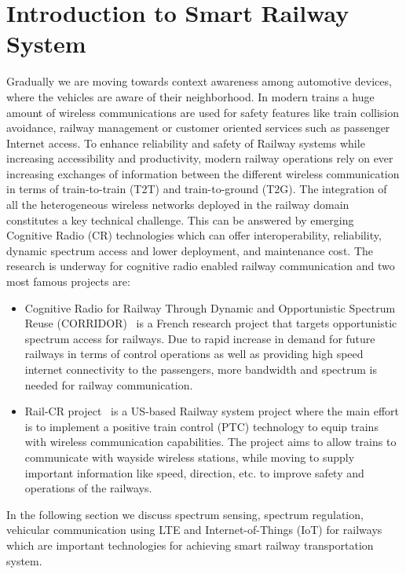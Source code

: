 \chapter{Introduction to Smart Railway System}

Gradually we are moving towards context awareness among automotive devices, where the vehicles are aware of their neighborhood. In modern trains a huge amount of wireless communications are used for safety features like train collision avoidance, railway management or customer oriented services such as passenger Internet access. To enhance reliability and safety of Railway systems while increasing accessibility and productivity, modern railway operations rely on ever increasing exchanges of information between the different wireless communication in terms of train-to-train (T2T) and train-to-ground (T2G). The integration of all the heterogeneous wireless networks deployed in the railway domain constitutes a key technical challenge. This can be answered by emerging Cognitive Radio (CR) technologies which can offer interoperability, reliability, dynamic spectrum access and lower deployment, and maintenance cost. The research is underway for cognitive radio enabled railway communication and two most famous projects are:

\begin{itemize}

\item Cognitive Radio for Railway Through Dynamic and Opportunistic Spectrum Reuse (CORRIDOR)~\cite{corridor} is a French research project that targets opportunistic spectrum access for railways. Due to rapid increase in demand for future railways in terms of control operations as well as providing high speed internet connectivity to the passengers, more bandwidth and spectrum is needed for railway communication.

\item Rail-CR project~\cite{5621621} is a US-based Railway system project where the main effort is to implement a positive train control (PTC) technology to equip trains with wireless communication capabilities. The project aims to allow trains to communicate with wayside wireless stations, while moving to supply important information like speed, direction, etc. to improve safety and operations of the railways.

\end{itemize}

In the following section we discuss spectrum sensing, spectrum regulation, vehicular communication using LTE and Internet-of-Things (IoT) for railways which are important technologies for achieving smart railway transportation system.

